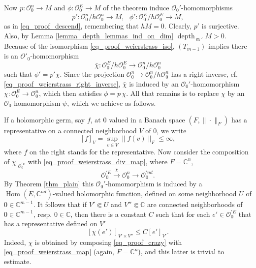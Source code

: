\documentclass{amsart}
\numberwithin{equation}{section}
\theoremstyle{definition}
\theoremstyle{plain}
\theoremstyle{remark}
\begin{document}
Now $p:{\ensuremath{\mathcal{{O}}}}^n_0\rightarrow M$ and $\phi:{\ensuremath{\mathcal{{O}}}}_0^E\rightarrow M$ of 
the theorem induce ${\ensuremath{\mathcal{{O}}}}_0'$-homomorphisms
\[
	p':{\ensuremath{\mathcal{{O}}}}_0^n/h{\ensuremath{\mathcal{{O}}}}_0^n\rightarrow M,\text{ }
	\phi':{\ensuremath{\mathcal{{O}}}}^E_0/h{\ensuremath{\mathcal{{O}}}}^E_0\rightarrow M,
\]
as in \eqref{eq_proof_descend}, remembering that $hM=0$. 
Clearly, $p'$ is surjective.
Also, by Lemma \ref{lemma_depth_lemmas_ind_on_dim} ${\mathop{\mathrm{depth}}\nolimits _{{{{\mathop{\mathfrak{m}}}}'}}} M>0$.
Because of the isomorphism \eqref{eq_proof_weierstrass_iso}, 
$(T_{m-1})$ implies there is an ${\ensuremath{\mathcal{{O}}}}'_0$-homomorphism 
\[
\bar\chi:{\ensuremath{\mathcal{{O}}}}_0^E/h{\ensuremath{\mathcal{{O}}}}_0^E\rightarrow{\ensuremath{\mathcal{{O}}}}_0^n/h{\ensuremath{\mathcal{{O}}}}_0^n
\]
such that $\phi'=p'\bar\chi$.  Since the projection
${\ensuremath{\mathcal{{O}}}}^n_0\rightarrow{\ensuremath{\mathcal{{O}}}}^n_0/h{\ensuremath{\mathcal{{O}}}}_0^n$ has a right inverse, cf. 
\eqref{eq_proof_weierstrass_right_inverse}, $\bar \chi$ is induced by an ${\ensuremath{\mathcal{{O}}}}_0'$-homomorphism $\chi:{\ensuremath{\mathcal{{O}}}}_0^E\rightarrow{\ensuremath{\mathcal{{O}}}}_0^n$, which
then satisfies $\phi=p\,\chi$. All that remains is to replace $\chi$ by an
${\ensuremath{\mathcal{{O}}}}_0$-homomorphism $\psi$, which we achieve as follows.

If a holomorphic germ, say $f$, at $0$  valued in a Banach
space $(F,\|\cdot\|_F)$ has a representative on a 
connected neighborhood $V$ of $0$, we write 
\[
	[f]_V=\sup_{v\in V} \|f(v)\|_F\leq\infty,
\]
where $f$ on the right stands for the representative.
Now consider the composition of $\chi|_{{\ensuremath{\mathcal{{O}}}}_0^{\prime E}}$ with
\eqref{eq_proof_weierstrass_div_map}, where $F=\mathbb{C}^n$,
\begin{equation}\label{eq_proof_crazy}
	{\ensuremath{\mathcal{{O}}}}_0^{\prime E}\xrightarrow{\chi}{\ensuremath{\mathcal{{O}}}}^n_0
	\rightarrow{\ensuremath{\mathcal{{O}}}}^{\prime nd}_0.
\end{equation}
By Theorem \ref{thm_plain} this ${\ensuremath{\mathcal{{O}}}}_0'$-homomorphism is induced by a 
${{\mathop{\mathrm{Hom}}}}(E,\mathbb{C}^{nd})$-valued holomorphic function, defined on
some neighborhood $U$ of $0\in\mathbb{C}^{m-1}$. It follows that
if $V'\Subset U$ and $V''\Subset \mathbb{C}$ are connected neighborhoods
of $0\in\mathbb{C}^{m-1}$, resp. $0\in\mathbb{C}$, then there is a constant
$C$ such that for each $e'\in{\ensuremath{\mathcal{{O}}}}^{\prime E}_0$ that has a representative
defined on $V'$
\begin{equation}\label{eq_proof_bdd}
[\chi(e')]_{V'\times V''}\leq C[e']_{V'}.
\end{equation}
Indeed, $\chi$ is obtained by composing \eqref{eq_proof_crazy} with 
\eqref{eq_proof_weierstrass_map} 
(again, $F=\mathbb{C}^n$), and this latter is trivial to estimate.
\end{document}
